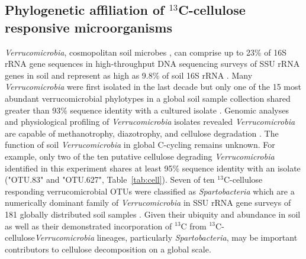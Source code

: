 \subsection{Phylogenetic affiliation of $^{13}$C-cellulose  responsive
microorganisms}
\textit{Verrucomicrobia}, cosmopolitan soil microbes
\citep{Bergmann_2011}, can comprise up to 23\% of 16S rRNA gene sequences in
high-throughput DNA sequencing surveys of SSU rRNA genes in soil
\citep{Bergmann_2011} and represent as high as 9.8\% of soil 16S rRNA
\citep{Buckley_2001}. Many \textit{Verrucomicrobia} were first isolated in the
last decade \cite{Wertz_2011} but only one of the 15 most abundant
verrucomicrobial phylotypes in a global soil sample collection shared greater
than 93\% sequence identity with a cultured isolate \citep{Bergmann_2011}.
Genomic analyses and physiological profiling of \textit{Verrucomicrobia}
isolates revealed \textit{Verrucomicrobia} are capable of methanotrophy,
diazotrophy, and cellulose degradation \citep{Otsuka_2012, Wertz_2011}. The function of soil \textit{Verrucomicrobia} in global C-cycling remains unknown.
For example, only two of the ten putative cellulose degrading \textit{Verrucomicrobia}
identified in this experiment shares at least 95\% sequence identity with
an isolate ("OTU.83" and "OTU.627", Table~\ref{tab:cell}). Seven of ten
$^{13}$C-cellulose responding verrucomicrobial OTUs were classified as
\textit{Spartobacteria} which are a numerically dominant
family of \textit{Verrucomicrobia} in SSU rRNA gene surveys of 181 globally
distributed soil samples \citep{Bergmann_2011}. Given their ubiquity and
abundance in soil as well as their demonstrated incorporation of $^{13}$C from
$^{13}$C-cellulose\textit{Verrucomicrobia} lineages, particularly \textit{Spartobacteria}, may be important contributors to cellulose decomposition on a global scale.

